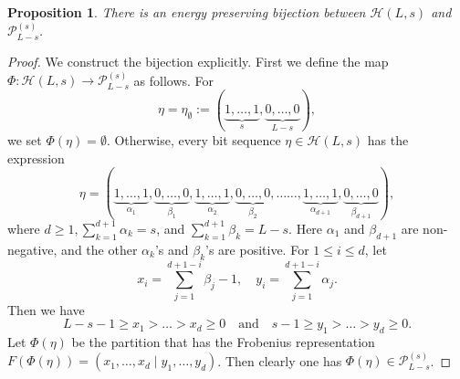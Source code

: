 \documentclass[sn-mathphys-num]{sn-jnl}%
\theoremstyle{thmstyleone}%
\newtheorem{proposition}[theorem]{Proposition}%
\theoremstyle{thmstyletwo}%
\theoremstyle{thmstylethree}%
\begin{document}
\begin{proposition}\label{prop:11}
There is an energy preserving bijection between $\mathcal{H}(L,s)$ and $\mathscr{P}^{(s)}_{L-s}$.
\end{proposition}
\begin{proof}
We construct the bijection explicitly.
First we define the map $\Phi : \mathcal{H}(L,s) \rightarrow \mathscr{P}^{(s)}_{L-s}$
as follows.
For 
\begin{equation}\label{eq:2024nov27_2}
\eta = \eta_{\emptyset} :=(\underbrace{1,\dots,1}_{s}, \underbrace{0, \dots, 0}_{L-s}),
\end{equation}
we set $\Phi(\eta) = \emptyset$.
Otherwise, every bit sequence $\eta \in \mathcal{H}(L,s)$ has the expression
\begin{equation}\label{eq:2024july5_1}
\eta =(\underbrace{1,\dots,1}_{\alpha_1}, \underbrace{0, \dots, 0}_{\beta_1},
\underbrace{1,\dots,1}_{\alpha_2}, \underbrace{0, \dots, 0}_{\beta_2},\dots \dots,\underbrace{1,\dots,1}_{\alpha_{d+1}}, \underbrace{0, \dots, 0}_{\beta_{d+1}}),
\end{equation}
where $d \geq 1, \sum_{k=1}^{d+1} \alpha_k = s$, and $\sum_{k=1}^{d+1} \beta_k = L-s$. 
Here $\alpha_1$ and $\beta_{d+1}$ are non-negative, and the other 
$\alpha_k$'s and  $\beta_k$'s are positive.
For $1 \leq i \leq d$, let
\begin{equation}\label{eq:2025jan10_1}
x_i = \sum_{j=1}^{d+1-i} \beta_j -1, \quad y_i = \sum_{j=1}^{d+1-i} \alpha_j.
\end{equation}
Then we have 
\begin{equation}\label{eq:2024nov27_3}
L-s-1 \geq x_1 > \dots > x_d \geq 0 \quad
\mbox{and} \quad s-1 \geq y_1 > \dots > y_d \geq 0.
\end{equation}
Let $\Phi (\eta)$ be the partition that has the Frobenius representation 
$F(\Phi (\eta)) = (x_1,\dots,x_d \mid y_1, \dots, y_d)$.
Then clearly one has $\Phi (\eta) \in \mathscr{P}^{(s)}_{L-s}$.


\end{proof}
\end{document}
